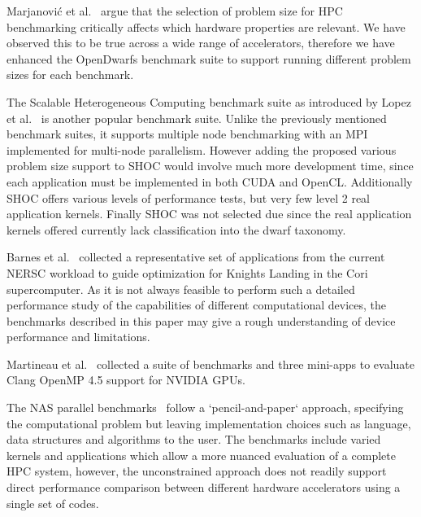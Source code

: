 \documentclass[../document.tex]{subfiles}
\begin{document}
\label{sec:related_work}

Marjanovi\'{c} et al.~\cite{marjanovic2016hpc} argue that the selection of problem size for HPC benchmarking critically affects which hardware properties are relevant.
We have observed this to be true across a wide range of accelerators, therefore we have enhanced the OpenDwarfs benchmark suite to support running different problem sizes for each benchmark.

The Scalable Heterogeneous Computing benchmark suite as introduced by Lopez et al.~\cite{lopez2015examining} is another popular benchmark suite.
Unlike the previously mentioned benchmark suites, it supports multiple node benchmarking with an MPI implemented for multi-node parallelism. 
However adding the proposed various problem size support to SHOC would involve much more development time, since each application must be implemented in both CUDA and OpenCL.
Additionally SHOC offers various levels of performance tests, but very few level 2 real application kernels.
Finally SHOC was not selected due since the real application kernels offered currently lack classification into the dwarf taxonomy.

Barnes et al.~\cite{barnes2016evaluating} collected a representative set of applications from the current NERSC workload to guide optimization for Knights Landing in the Cori supercomputer.
As it is not always feasible to perform such a detailed performance study of the capabilities of different computational devices, the benchmarks described in this paper may give a rough understanding of device performance and limitations.

Martineau et al.~\cite{martineau2016performance} collected a suite of benchmarks and three mini-apps to evaluate Clang OpenMP 4.5 support for NVIDIA GPUs.

The NAS parallel benchmarks~\cite{bailey1991parallel} follow a `pencil-and-paper` approach, specifying the computational problem but leaving implementation choices such as language, data structures and algorithms to the user.
The benchmarks include varied kernels and applications which allow a more nuanced evaluation of a complete HPC system, however, the unconstrained approach does not readily support direct performance comparison between different hardware accelerators using a single set of codes.
\end{document}
